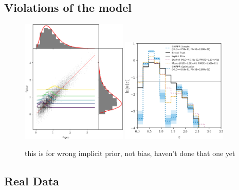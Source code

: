 \subsection{Violations of the model}


\begin{figure}
	\begin{center}
		\includegraphics[width=0.45\textwidth]{figures/chippr/wrong_scatter.png}
		\includegraphics[width=0.45\textwidth]{figures/chippr/wrong_log_estimators.png}
		\caption{this is for wrong implicit prior, not bias, haven't done that one yet}
	\end{center}
\end{figure}

\subsection{Real Data}


